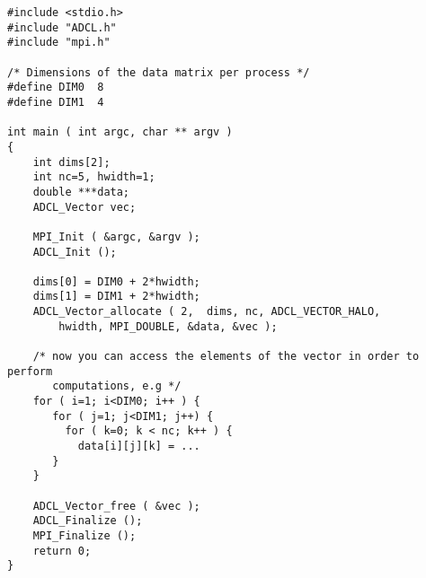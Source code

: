 \begin{verbatim}
#include <stdio.h>
#include "ADCL.h"
#include "mpi.h"

/* Dimensions of the data matrix per process */
#define DIM0  8
#define DIM1  4

int main ( int argc, char ** argv ) 
{
    int dims[2];
    int nc=5, hwidth=1;
    double ***data;
    ADCL_Vector vec;
    
    MPI_Init ( &argc, &argv );
    ADCL_Init ();
    
    dims[0] = DIM0 + 2*hwidth;
    dims[1] = DIM1 + 2*hwidth;
    ADCL_Vector_allocate ( 2,  dims, nc, ADCL_VECTOR_HALO, 
        hwidth, MPI_DOUBLE, &data, &vec );
    
    /* now you can access the elements of the vector in order to perform 
       computations, e.g */
    for ( i=1; i<DIM0; i++ ) {
       for ( j=1; j<DIM1; j++) {
         for ( k=0; k < nc; k++ ) {
           data[i][j][k] = ...
       }
    }
    
    ADCL_Vector_free ( &vec );        
    ADCL_Finalize ();
    MPI_Finalize ();
    return 0;
}
\end{verbatim}


